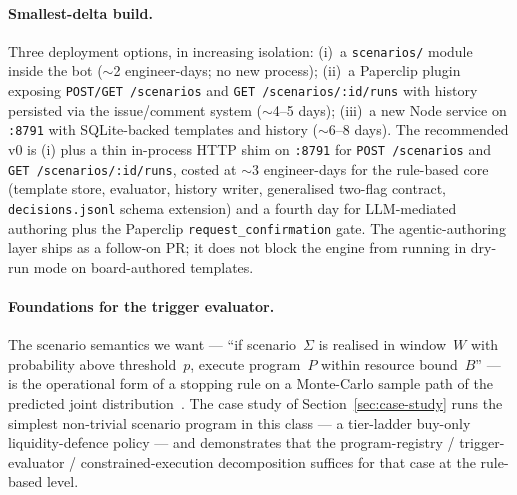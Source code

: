\documentclass[11pt,a4paper]{article}
\begin{document}
\paragraph{Smallest-delta build.} Three deployment options, in increasing isolation:
(i)~a \texttt{scenarios/} module inside the bot ($\sim$2 engineer-days; no new
process); (ii)~a Paperclip plugin exposing \texttt{POST/GET /scenarios} and
\texttt{GET /scenarios/:id/runs} with history persisted via the issue/comment system
($\sim$4--5 days); (iii)~a new Node service on \texttt{:8791} with SQLite-backed
templates and history ($\sim$6--8 days). The recommended v0 is (i) plus a thin
in-process HTTP shim on \texttt{:8791} for \texttt{POST /scenarios} and
\texttt{GET /scenarios/:id/runs}, costed at $\sim$3 engineer-days for the rule-based
core (template store, evaluator, history writer, generalised two-flag contract,
\texttt{decisions.jsonl} schema extension) and a fourth day for LLM-mediated authoring
plus the Paperclip \texttt{request\_confirmation} gate. The agentic-authoring layer
ships as a follow-on PR; it does not block the engine from running in dry-run mode on
board-authored templates.

\paragraph{Foundations for the trigger evaluator.} The scenario semantics we want ---
``if scenario~$\Sigma$ is realised in window~$W$ with probability above threshold~$p$,
execute program~$P$ within resource bound~$B$'' --- is the operational form of a
stopping rule on a Monte-Carlo sample path of the predicted joint
distribution~\cite{glasserman2003monte}. The case study of Section~\ref{sec:case-study}
runs the simplest non-trivial scenario program in this class --- a tier-ladder
buy-only liquidity-defence policy --- and demonstrates that the program-registry /
trigger-evaluator / constrained-execution decomposition suffices for that case at
the rule-based level.
\end{document}
